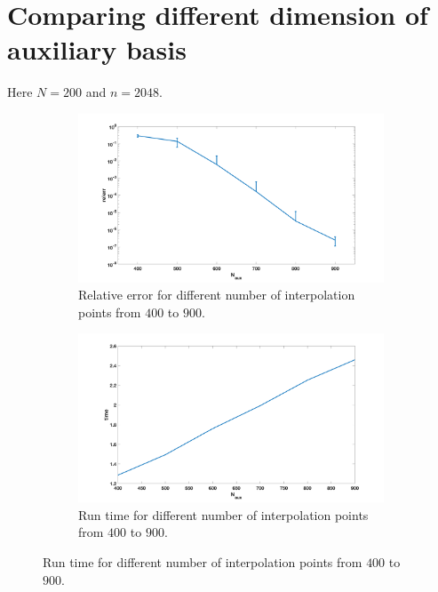 \documentclass[11pt]{article}
\begin{document}
\section{Comparing different dimension of auxiliary basis}
Here $N = 200$ and $n = 2048$.

\begin{figure}[H]
	\centering
	\begin{subfigure}{\textwidth}
		\centering
		\includegraphics[width = \textwidth]{N200n2048.png}
		\caption{Relative error for different number of interpolation points from $400$ to $900$.}
	\end{subfigure}
	\begin{subfigure}{\textwidth}
		\centering
		\includegraphics[width = \textwidth]{N200n2048t.png}
		\caption{Run time for different number of interpolation points from $400$ to $900$.}
	\end{subfigure}
\end{figure}
\end{document}
